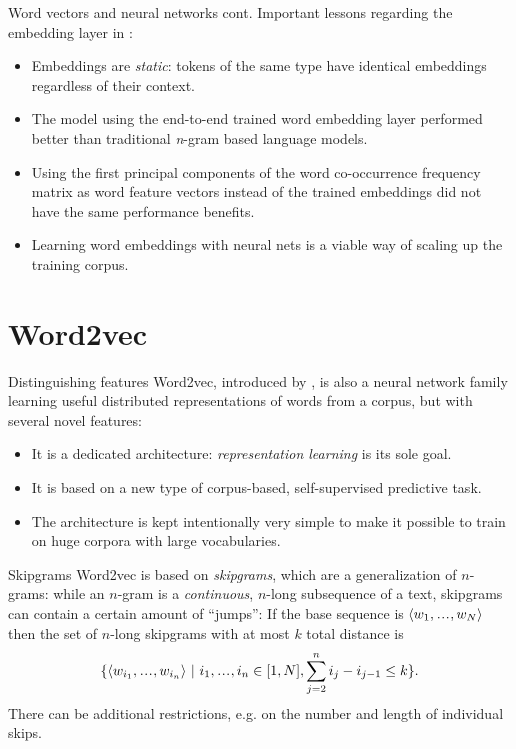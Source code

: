 \documentclass[style=upen, size=14pt]{powerdot}
\newcommand\varlist{,\makebox[1em][c]{.\hfil.\hfil.},}
\theoremstyle{definition}
\begin{document}
\begin{slide}[toc=]{Word vectors and neural networks cont.}
  Important lessons regarding the embedding layer in \cite{bengio2003neural}:
  \begin{itemize}
  \item Embeddings are \emph{static}: tokens of the same type have identical
    embeddings regardless of their context.
  \item The model using the end-to-end trained word embedding layer performed
    better than traditional \emph{n}-gram based language models.
  \item Using the first principal components of the word co-occurrence frequency
    matrix as word feature vectors instead of the trained embeddings did not
    have the same performance benefits.
  \item Learning word embeddings with neural nets is a viable way of scaling up
    the training corpus. 
  \end{itemize}
\end{slide}

\section{Word2vec}

\begin{slide}[toc=Novelties]{Distinguishing features}
  Word2vec, introduced by \cite{mikolov2013efficient}, is also a neural network
  family learning useful distributed representations of words from a corpus, but
  with several novel features:
  \begin{itemize}
  \item It is a dedicated architecture: \emph{representation learning} is its
    sole goal.
  \item It is based on a new type of corpus-based, self-supervised predictive
    task.
  \item The architecture is kept intentionally very simple to make it possible
    to train on huge corpora with large vocabularies.
  \end{itemize}
\end{slide}

\begin{slide}[toc=Skipgrams]{Skipgrams}
  Word2vec is based on \emph{skipgrams}, which are a generalization of
  $n$-grams: while an $n$-gram is a \emph{continuous}, $n$-long subsequence of a
  text, skipgrams can contain a certain amount of ``jumps'': If the base
  sequence is $\langle w_1\varlist w_N\rangle$ then the set of $n$-long
  skipgrams with at most $k$ total distance is
  $$
  \{\langle w_{i_1} \varlist w_{i_n}\rangle~|~ i_1\varlist i_n\in[1, N],
  \sum_{j=2}^n i_j-i_{j-1} \leq k \}.
  $$
  There can be additional restrictions, e.g. on the number and length of
  individual skips.
\end{slide}
\end{document}
